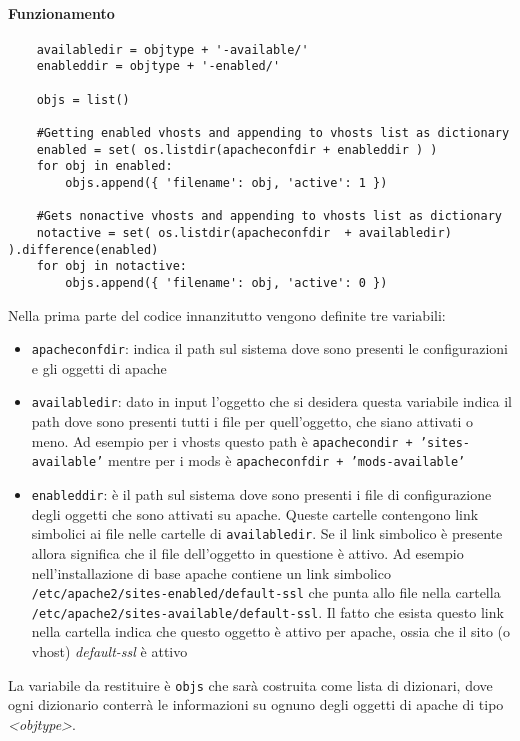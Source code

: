 \documentclass[11pt]{article}
\begin{document}
\paragraph{Funzionamento}
\begin{lstlisting}
    availabledir = objtype + '-available/'
    enableddir = objtype + '-enabled/'

    objs = list()

    #Getting enabled vhosts and appending to vhosts list as dictionary
    enabled = set( os.listdir(apacheconfdir + enableddir ) )
    for obj in enabled:
        objs.append({ 'filename': obj, 'active': 1 })

    #Gets nonactive vhosts and appending to vhosts list as dictionary
    notactive = set( os.listdir(apacheconfdir  + availabledir) ).difference(enabled)
    for obj in notactive:
        objs.append({ 'filename': obj, 'active': 0 })

\end{lstlisting}
Nella prima parte del codice innanzitutto vengono definite tre variabili:
\begin{itemize}
	\item{\texttt{apacheconfdir}: indica il path sul sistema dove sono presenti le configurazioni e gli oggetti di apache}
	\item{\texttt{availabledir}: dato in input l'oggetto che si desidera questa variabile indica il path dove sono presenti
		tutti i file per quell'oggetto, che siano attivati o meno. Ad esempio per i vhosts questo path è
		\texttt{apachecondir + 'sites-available'} mentre per i mods è \texttt{apacheconfdir + 'mods-available'}}
	\item{\texttt{enableddir}: è il path sul sistema dove sono presenti i file di configurazione degli oggetti che sono
		attivati su apache. Queste cartelle contengono link simbolici ai file nelle cartelle di \texttt{availabledir}.
		Se il link simbolico è presente allora significa che il file dell'oggetto in questione è attivo.
		Ad esempio nell'installazione di base apache contiene un link simbolico \texttt{/etc/apache2/sites-enabled/default-ssl} che punta
		allo file nella cartella \texttt{/etc/apache2/sites-available/default-ssl}. Il fatto che esista questo link
		nella cartella indica che questo oggetto è attivo per apache, ossia che il sito (o vhost) \textit{default-ssl}
		è attivo}
\end{itemize}
La variabile da restituire è \texttt{objs} che sarà costruita come lista di dizionari, dove ogni dizionario conterrà le informazioni
su ognuno degli oggetti di apache di tipo \textit{<objtype>}.
\end{document}

